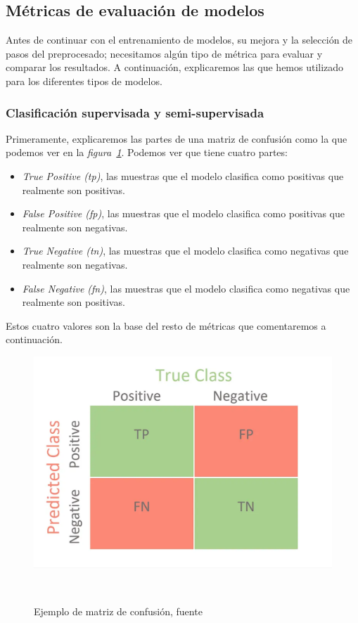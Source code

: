 \subsection{Métricas de evaluación de modelos}

Antes de continuar con el entrenamiento de modelos, su mejora y la selección de pasos del preprocesado; necesitamos algún tipo de métrica para evaluar y comparar los resultados. A continuación, explicaremos las que hemos utilizado para los diferentes tipos de modelos.

\subsubsection{Clasificación supervisada y semi-supervisada}

Primeramente, explicaremos las partes de una matriz de confusión como la que podemos ver en la \textit{figura\ \ref{fig:confusion-matrix-example}}. Podemos ver que tiene cuatro partes:

\begin{itemize}
    \item \textit{True Positive (tp)}, las muestras que el modelo clasifica como positivas que realmente son positivas.
    \item \textit{False Positive (fp)}, las muestras que el modelo clasifica como positivas que realmente son negativas.
    \item \textit{True Negative (tn)}, las muestras que el modelo clasifica como negativas que realmente son negativas.
    \item \textit{False Negative (fn)}, las muestras que el modelo clasifica como negativas que realmente son positivas.
\end{itemize}

Estos cuatro valores son la base del resto de métricas que comentaremos a continuación.

\begin{figure}[!ht]
    \centering
    \includegraphics[width=0.7\linewidth]{media/images/confusion-matrix-example.png}
    \caption{Ejemplo de matriz de confusión, fuente\ \cite{Confusio71:online}}\ \label{fig:confusion-matrix-example}
\end{figure}

